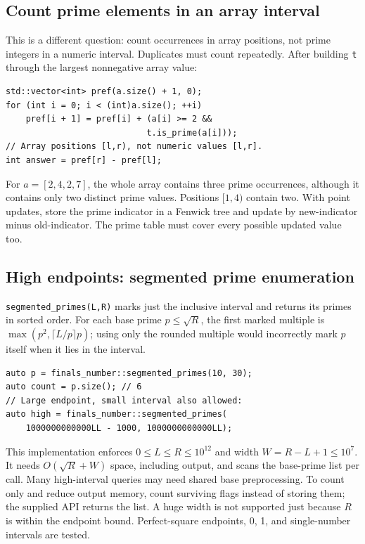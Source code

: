 \subsection{Count prime elements in an array interval}
This is a different question: count occurrences in array positions, not
prime integers in a numeric interval. Duplicates must count repeatedly.
After building \texttt{t} through the largest nonnegative array value:
\begin{lstlisting}
std::vector<int> pref(a.size() + 1, 0);
for (int i = 0; i < (int)a.size(); ++i)
    pref[i + 1] = pref[i] + (a[i] >= 2 &&
                            t.is_prime(a[i]));
// Array positions [l,r), not numeric values [l,r].
int answer = pref[r] - pref[l];
\end{lstlisting}
For $a=[2,4,2,7]$, the whole array contains three prime occurrences,
although it contains only two distinct prime values. Positions $[1,4)$
contain two. With point updates, store the prime indicator in a Fenwick
tree and update by new-indicator minus old-indicator. The prime table must
cover every possible updated value too.

\subsection{High endpoints: segmented prime enumeration}
\texttt{segmented\_primes(L,R)} marks just the inclusive interval and
returns its primes in sorted order. For each base prime $p\le\sqrt R$,
the first marked multiple is
$\max(p^2,\lceil L/p\rceil p)$; using only the rounded multiple would
incorrectly mark $p$ itself when it lies in the interval.
\begin{lstlisting}
auto p = finals_number::segmented_primes(10, 30);
auto count = p.size(); // 6
// Large endpoint, small interval also allowed:
auto high = finals_number::segmented_primes(
    1000000000000LL - 1000, 1000000000000LL);
\end{lstlisting}
This implementation enforces $0\le L\le R\le10^{12}$ and width
$W=R-L+1\le10^7$. It needs $O(\sqrt R+W)$ space, including output,
and scans the base-prime list per call. Many high-interval queries may need
shared base preprocessing. To count only and reduce output memory, count
surviving flags instead of storing them; the supplied API returns the list.
A huge width is not supported just because $R$ is within the endpoint bound.
Perfect-square endpoints, 0, 1, and single-number intervals are tested.

